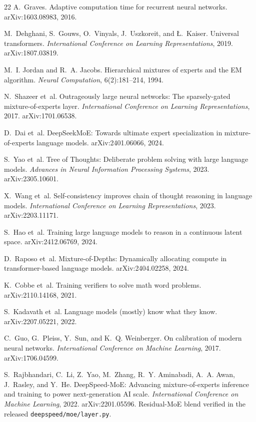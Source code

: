 \documentclass[10pt,a4paper]{article}
\begin{document}
\begin{thebibliography}{22}
A.~Graves.
Adaptive computation time for recurrent neural networks.
arXiv:1603.08983, 2016.

M.~Dehghani, S.~Gouws, O.~Vinyals, J.~Uszkoreit, and {\L}.~Kaiser.
Universal transformers.
\emph{International Conference on Learning Representations}, 2019.
arXiv:1807.03819.

M.~I. Jordan and R.~A. Jacobs.
Hierarchical mixtures of experts and the EM algorithm.
\emph{Neural Computation}, 6(2):181--214, 1994.

N.~Shazeer et~al.
Outrageously large neural networks: The sparsely-gated mixture-of-experts
layer.
\emph{International Conference on Learning Representations}, 2017.
arXiv:1701.06538.

D.~Dai et~al.
DeepSeekMoE: Towards ultimate expert specialization in mixture-of-experts
language models.
arXiv:2401.06066, 2024.

S.~Yao et~al.
Tree of Thoughts: Deliberate problem solving with large language models.
\emph{Advances in Neural Information Processing Systems}, 2023.
arXiv:2305.10601.

X.~Wang et~al.
Self-consistency improves chain of thought reasoning in language models.
\emph{International Conference on Learning Representations}, 2023.
arXiv:2203.11171.

S.~Hao et~al.
Training large language models to reason in a continuous latent space.
arXiv:2412.06769, 2024.

D.~Raposo et~al.
Mixture-of-Depths: Dynamically allocating compute in transformer-based
language models.
arXiv:2404.02258, 2024.

K.~Cobbe et~al.
Training verifiers to solve math word problems.
arXiv:2110.14168, 2021.

S.~Kadavath et~al.
Language models (mostly) know what they know.
arXiv:2207.05221, 2022.

C.~Guo, G.~Pleiss, Y.~Sun, and K.~Q. Weinberger.
On calibration of modern neural networks.
\emph{International Conference on Machine Learning}, 2017.
arXiv:1706.04599.

S.~Rajbhandari, C.~Li, Z.~Yao, M.~Zhang, R.~Y. Aminabadi, A.~A. Awan,
J.~Rasley, and Y.~He.
DeepSpeed-MoE: Advancing mixture-of-experts inference and training to power
next-generation AI scale.
\emph{International Conference on Machine Learning}, 2022.
arXiv:2201.05596. Residual-MoE blend verified in the released
\texttt{deepspeed/moe/layer.py}.


\end{thebibliography}
\end{document}
